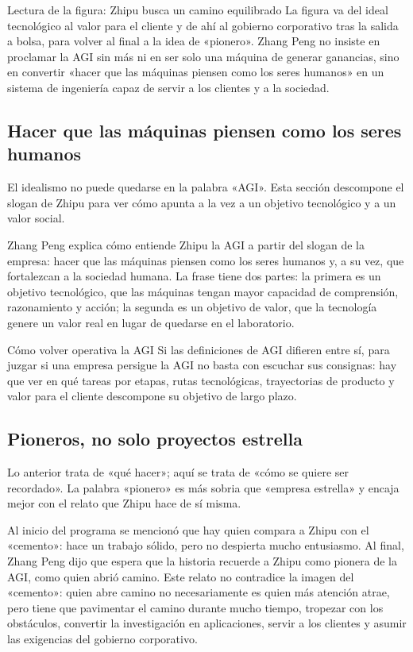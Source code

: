 \documentclass[a4paper]{article}
\begin{document}
\begin{knowledgebox}{Lectura de la figura: Zhipu busca un camino equilibrado}
La figura va del ideal tecnológico al valor para el cliente y de ahí al gobierno corporativo tras la salida a bolsa, para volver al final a la idea de «pionero». Zhang Peng no insiste en proclamar la AGI sin más ni en ser solo una máquina de generar ganancias, sino en convertir «hacer que las máquinas piensen como los seres humanos» en un sistema de ingeniería capaz de servir a los clientes y a la sociedad.
\end{knowledgebox}

\subsection{Hacer que las máquinas piensen como los seres humanos}

El idealismo no puede quedarse en la palabra «AGI». Esta sección descompone el slogan de Zhipu para ver cómo apunta a la vez a un objetivo tecnológico y a un valor social.

Zhang Peng explica cómo entiende Zhipu la AGI a partir del slogan de la empresa: hacer que las máquinas piensen como los seres humanos y, a su vez, que fortalezcan a la sociedad humana. La frase tiene dos partes: la primera es un objetivo tecnológico, que las máquinas tengan mayor capacidad de comprensión, razonamiento y acción; la segunda es un objetivo de valor, que la tecnología genere un valor real en lugar de quedarse en el laboratorio.

\begin{importantbox}{Cómo volver operativa la AGI}
Si las definiciones de AGI difieren entre sí, para juzgar si una empresa persigue la AGI no basta con escuchar sus consignas: hay que ver en qué tareas por etapas, rutas tecnológicas, trayectorias de producto y valor para el cliente descompone su objetivo de largo plazo.
\end{importantbox}

\subsection{Pioneros, no solo proyectos estrella}

Lo anterior trata de «qué hacer»; aquí se trata de «cómo se quiere ser recordado». La palabra «pionero» es más sobria que «empresa estrella» y encaja mejor con el relato que Zhipu hace de sí misma.

Al inicio del programa se mencionó que hay quien compara a Zhipu con el «cemento»: hace un trabajo sólido, pero no despierta mucho entusiasmo. Al final, Zhang Peng dijo que espera que la historia recuerde a Zhipu como pionera de la AGI, como quien abrió camino. Este relato no contradice la imagen del «cemento»: quien abre camino no necesariamente es quien más atención atrae, pero tiene que pavimentar el camino durante mucho tiempo, tropezar con los obstáculos, convertir la investigación en aplicaciones, servir a los clientes y asumir las exigencias del gobierno corporativo.
\end{document}
